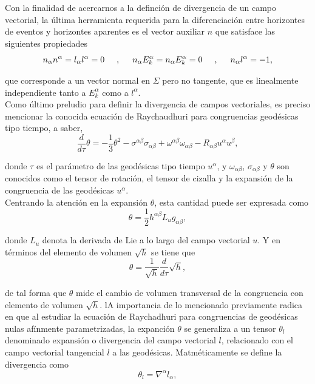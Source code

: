 \documentclass{article}
\numberwithin{equation}{section}
\theoremstyle{definition}
\begin{document}
Con la finalidad de acercarnos a la definción de divergencia de un campo vectorial, la última herramienta requerida para la diferenciación entre horizontes de eventos y horizontes aparentes es el vector auxiliar $n$ que satisface las siguientes propiedades
\begin{equation}
\label{prop div}
n_\alpha n^\alpha = l_\alpha l^\alpha = 0 \hspace{.5cm},\hspace{.5cm} n_\alpha E^{\alpha}_{k} =  n_\alpha E^{\alpha}_{k} = 0 \hspace{.5cm},\hspace{.5cm} n_\alpha l^\alpha = -1,
\end{equation}

que corresponde a un vector normal en $\Sigma$ pero no tangente, que es linealmente independiente tanto a $E^{\alpha}_{k}$ como a $l^\alpha$.\\

Como último preludio para definir la divergencia de campos vectoriales, es preciso mencionar la conocida ecuación de Raychaudhuri para congruencias geodésicas tipo tiempo, a saber,
\begin{equation*}
\frac{d}{d\tau}\theta = -\frac{1}{3}\theta^2 - \sigma^{\alpha \beta}\sigma_{\alpha \beta} + \omega^{\alpha \beta}\omega_{\alpha \beta}-R_{\alpha \beta}u^\alpha u^\beta,
\end{equation*}

donde $\tau$ es el parámetro de las geodésicas tipo tiempo $u^\alpha$, y $\omega_{\alpha \beta}$, $\sigma_{\alpha \beta}$ y $\theta$ son conocidos como el tensor de rotación, el tensor de cizalla y la expansión de la congruencia de las geodésicas $u^\alpha$.\\

Centrando la atención en la expansión $\theta$, esta cantidad puede ser expresada como
\begin{equation*}
\theta = \frac{1}{2}h^{\alpha \beta}L_ug_{\alpha \beta},
\end{equation*}

donde $L_u$ denota la derivada de Lie a lo largo del campo vectorial $u$. Y en términos del elemento de volumen $\sqrt{h}$ se tiene que \cite{blau}
\begin{equation*}
\theta = \frac{1}{\sqrt{h}}\frac{d}{d\tau}\sqrt{h},
\end{equation*}

de tal forma que $\theta$ mide el cambio de volumen transversal de la congruencia con elemento de volumen $\sqrt{h}$. lA importancia de lo mencionado previamente radica en que al estudiar la ecuación de Raychadhuri para congruencias de geodésicas nulas afínmente parametrizadas, la expanción $\theta$ se generaliza a un tensor $\theta_l$ denominado expansión o divergencia del campo vectorial $l$, relacionado con el campo vectorial tangencial $l$ a las geodésicas. Matméticamente se define la divergencia como 
\begin{equation*}
\theta_l = \nabla^\alpha l_\alpha,
\end{equation*}
\end{document}
